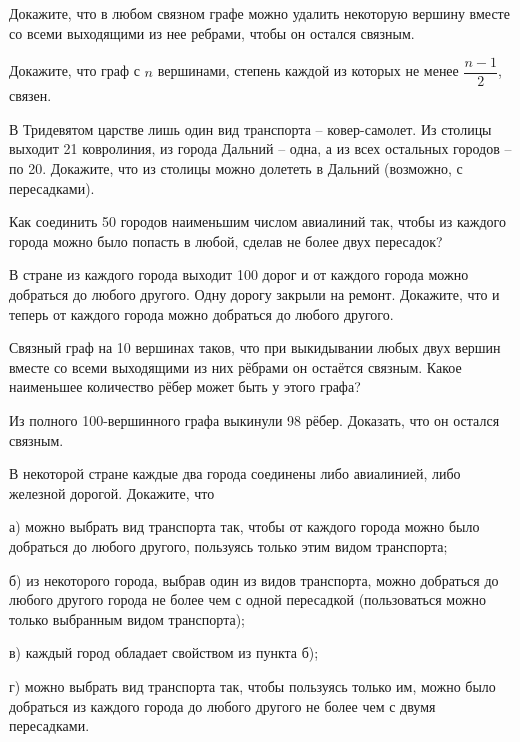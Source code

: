 \documentclass{article}
\begin{document}
\begin{enumerate_boxed}
        \item Докажите, что в любом связном графе можно удалить некоторую вершину вместе со всеми выходящими из нее ребрами, чтобы он остался связным.

        \item Докажите, что граф с $n$ вершинами, степень каждой из которых не менее $\dfrac{n - 1}{2}$, связен.

        \item В Тридевятом царстве лишь один вид транспорта – ковер-самолет.
        Из столицы выходит 21 ковролиния, из города Дальний – одна, а из всех остальных городов – по 20.
        Докажите, что из столицы можно долететь в Дальний (возможно, с пересадками).

        \item Как соединить 50 городов наименьшим числом авиалиний так, чтобы из каждого города можно было попасть в любой, сделав не более двух пересадок?

        \item В стране из каждого города выходит 100 дорог и от каждого города можно добраться до любого другого.
        Одну дорогу закрыли на ремонт.
        Докажите, что и теперь от каждого города можно добраться до любого другого.

        \item Связный граф на 10 вершинах таков, что при выкидывании любых двух вершин вместе со всеми выходящими из них рёбрами он остаётся связным.
        Какое наименьшее количество рёбер может быть у этого графа?

        \item Из полного 100-вершинного графа выкинули 98 рёбер.
        Доказать, что он остался связным.

        \item В некоторой стране каждые два города соединены либо авиалинией, либо железной дорогой.
        Докажите, что

        а) можно выбрать вид транспорта так, чтобы от каждого города можно было добраться до любого другого, пользуясь только этим видом транспорта;

        б) из некоторого города, выбрав один из видов транспорта, можно добраться до любого другого города не более чем с одной пересадкой (пользоваться можно только выбранным видом транспорта);

        в) каждый город обладает свойством из пункта б);

        г) можно выбрать вид транспорта так, чтобы пользуясь только им, можно было добраться из каждого города до любого другого не более чем с двумя пересадками.


\end{enumerate_boxed}
\end{document}
